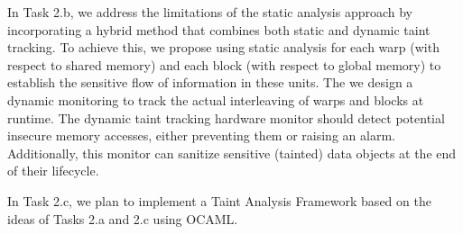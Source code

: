 In Task 2.b, we address the limitations of the static analysis approach by incorporating a hybrid method that combines both static and dynamic taint tracking.
% 
%
To achieve this, we propose using static analysis for each warp (with respect to shared memory) and each block (with respect to global memory) to establish the sensitive flow of information in these units.
%
The we design a dynamic monitoring to track the actual interleaving of warps and blocks at runtime.
% 
The dynamic taint tracking hardware monitor should detect potential insecure memory accesses, either preventing them or raising an alarm.
% 
Additionally, this monitor can sanitize sensitive (tainted) data objects at the end of their lifecycle.

%

In Task 2.c, we plan to implement a Taint Analysis Framework based on the ideas of Tasks 2.a and 2.c using OCAML.
%


